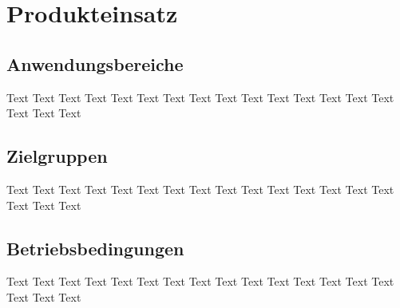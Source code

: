 \chapter{Produkteinsatz}
\section{Anwendungsbereiche}
Text Text Text Text Text Text Text Text Text Text Text Text Text Text Text Text Text Text
\section{Zielgruppen}
Text Text Text Text Text Text Text Text Text Text Text Text Text Text Text Text Text Text
\section{Betriebsbedingungen}
Text Text Text Text Text Text Text Text Text Text Text Text Text Text Text Text Text Text
